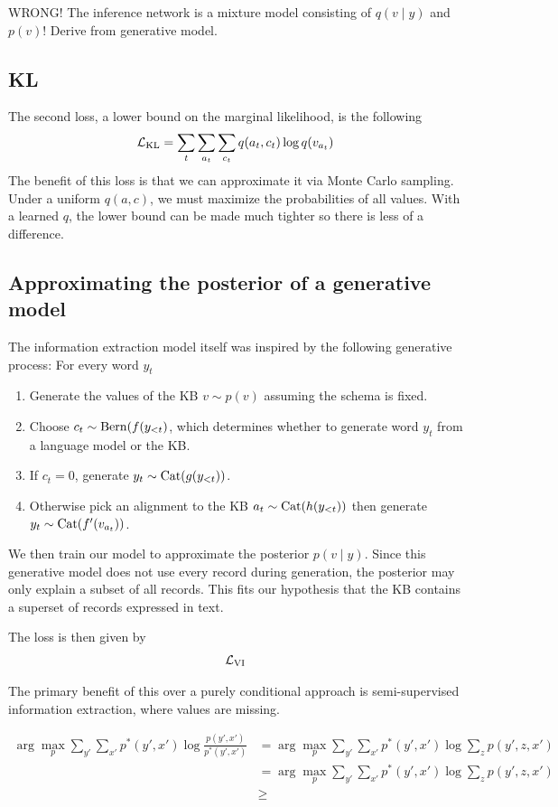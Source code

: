 \documentclass[12pt]{article}
\begin{document}
WRONG! The inference network is a mixture model consisting of $q(v\mid y)$ and $p(v)$!
Derive from generative model.

\subsection{KL}
The second loss, a lower bound on the marginal likelihood, is the following
$$\mathcal{L}_{\textrm{KL}} = \sum_t \sum_{a_t} \sum_{c_t} q(a_t,c_t)\log q(v_{a_t})$$
The benefit of this loss is that we can approximate it via Monte Carlo sampling.
Under a uniform $q(a,c)$, we must maximize the probabilities of all values.
With a learned $q$, the lower bound can be made much tighter so there is
less of a difference.

\subsection{Approximating the posterior of a generative model}
The information extraction model itself was inspired by the following generative process:
For every word $y_t$
\begin{enumerate}
\item Generate the values of the KB $v \sim p(v)$ assuming the schema is fixed.
\item Choose $c_t \sim \mathrm{Bern}(f(y_{<t})$, which determines whether to generate 
    word $y_t$ from a language model or the KB.
\item If $c_t = 0$, generate $y_t \sim \mathrm{Cat}(g(y_{<t}))$.
\item Otherwise pick an alignment to the KB $a_t \sim \mathrm{Cat}(h(y_{<t}))$
    then generate $y_t \sim \mathrm{Cat}(f'(v_{a_t}))$.
\end{enumerate}
We then train our model to approximate the posterior $p(v \mid y)$.
Since this generative model does not use every record during generation,
the posterior may only explain a subset of all records.
This fits our hypothesis that the KB contains a superset of records expressed in text.

The loss is then given by
\begin{align*}
\mathcal{L}_{\textrm{VI}}
\end{align*}

The primary benefit of this over a purely conditional approach is semi-supervised information extraction,
where values are missing.

\begin{align}
\arg\max_p \sum_{y'}\sum_{x'} p^*(y',x')\log \frac{p(y',x')}{p^*(y',x')}
&= \arg\max_p \sum_{y'}\sum_{x'} p^*(y',x')\log \sum_z p(y',z,x')\\
&= \arg\max_p \sum_{y'}\sum_{x'} p^*(y',x')\log \sum_z p(y',z,x')\\
&\geq 
\end{align}



\end{document}
